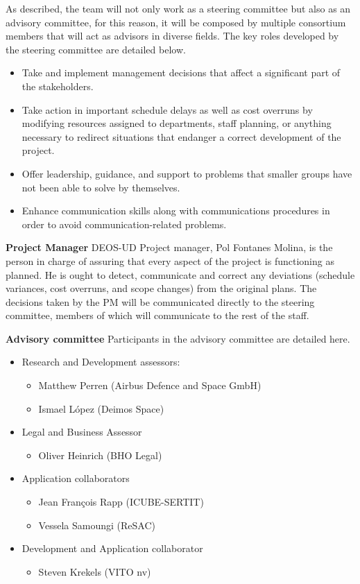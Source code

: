 As described, the team will not only work as a steering committee but also as an advisory committee, for this reason, it will be composed by multiple consortium members that will act as advisors in diverse fields. 
The key roles developed by the steering committee are detailed below. 
 \begin{itemize}
 	\item	Take and implement management decisions that affect a significant part of the stakeholders. 
 	\item	Take action in important schedule delays as well as cost overruns by modifying resources assigned to departments, staff planning, or anything necessary to redirect situations that endanger a correct development of the project.
 	\item 	Offer leadership, guidance, and support to problems that smaller groups have not been able to solve by themselves. 
 	\item Enhance communication skills along with communications procedures in order to avoid communication-related problems.
 \end{itemize}

\textbf{Project Manager}
\newline
\newline
DEOS-UD Project manager, Pol Fontanes Molina, is the person in charge of assuring that every aspect of the project is functioning as planned. He is ought to detect, communicate and correct any deviations (schedule variances, cost overruns, and scope changes) from the original plans. The decisions taken by the PM will be communicated directly to the steering committee, members of which will communicate to the rest of the staff.

\textbf{Advisory committee}
\newline
\newline
Participants in the advisory committee are detailed here.
 \begin{itemize}
 	\item  Research and Development assessors: 
 	\begin{itemize}
 		\item Matthew Perren (Airbus Defence and Space GmbH)
 		\item Ismael López (Deimos Space)
 	\end{itemize}
 \item 	Legal and Business Assessor
 \begin{itemize}
 	\item Oliver Heinrich (BHO Legal)
  \end{itemize}
\item Application collaborators
\begin{itemize}
	\item Jean François Rapp (ICUBE-SERTIT)
	\item Vessela Samoungi (ReSAC)
\end{itemize}
\item Development and Application collaborator
 \begin{itemize}
	\item Steven Krekels (VITO nv)
\end{itemize}
 \end{itemize}

